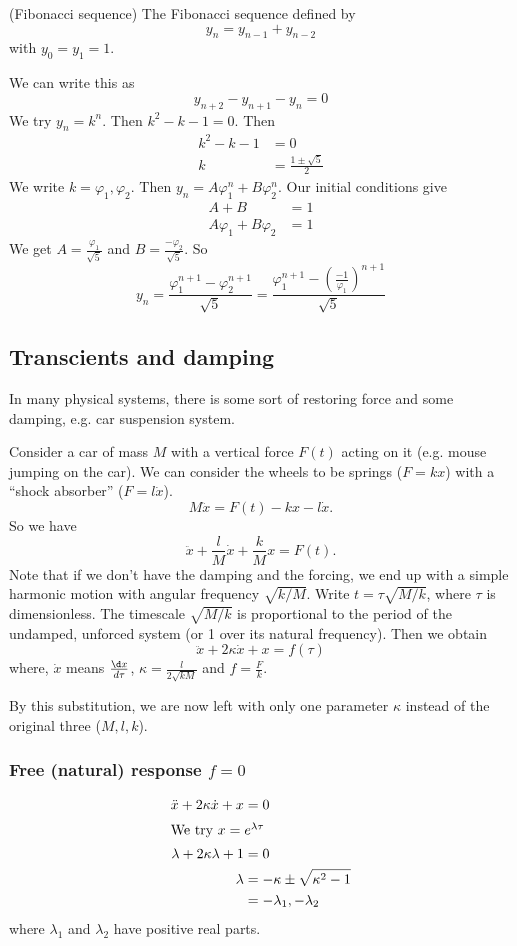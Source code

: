 \documentclass[a4paper]{article}
\begin{document}
\begin{eg}
  (Fibonacci sequence) The Fibonacci sequence defined by
  \[
  y_n = y_{n - 1} + y_{n - 2}
  \]
  with $y_0 = y_1 = 1$.

  We can write this as
  \[
  y_{n + 2} - y_{n + 1} - y_n = 0
  \]
  We try $y_n = k^n$. Then $k^2 - k - 1 = 0$. Then
  \begin{align*}
    k^2 - k - 1 &= 0\\
    k &= \frac{1 \pm \sqrt{5}}{2}
  \end{align*}
  We write $k = \varphi_1, \varphi_2$. Then $y_n = A\varphi_1^n + B\varphi_2^n$. Our initial conditions give
  \begin{align*}
    A + B &= 1\\
    A\varphi_1 + B\varphi_2 &= 1
  \end{align*}
  We get $\displaystyle A = \frac{\varphi_1}{\sqrt{5}}$ and $\displaystyle B = \frac{-\varphi_2}{\sqrt{5}}$. So
  \[
  y_n = \frac{\varphi_1^{n + 1} - \varphi_2^{n + 1}}{\sqrt{5}} = \frac{\varphi_1^{n + 1} - \left(\frac{-1}{\varphi_1}\right)^{n + 1}}{\sqrt{5}}
  \]
\end{eg}

\subsection{Transcients and damping}
In many physical systems, there is some sort of restoring force and some damping, e.g. car suspension system.

Consider a car of mass $M$ with a vertical force $F(t)$ acting on it (e.g. mouse jumping on the car). We can consider the wheels to be springs ($F = kx$) with a ``shock absorber'' ($F = l\dot x$).
\[
M\ddot x = F(t) - kx - l\dot x.
\]
So we have
\[
\ddot x + \frac{l}{M}\dot x + \frac{k}{M}x = F(t).
\]
Note that if we don't have the damping and the forcing, we end up with a simple harmonic motion with angular frequency $\sqrt{k/M}$. Write $t = \tau \sqrt{M/k}$, where $\tau$ is dimensionless. The timescale $\sqrt{M/k}$ is proportional to the period of the undamped, unforced system (or 1 over its natural frequency). Then we obtain
\[
\ddot x + 2\kappa\dot x + x = f(\tau)
\]
where, $\dot x$ means $\frac{\d x}{d\tau}$, $\kappa = \frac{l}{2\sqrt{kM}}$ and $f = \frac{F}{k}$.

By this substitution, we are now left with only one parameter $\kappa$ instead of the original three ($M, l, k$).

\subsubsection{Free (natural) response \texorpdfstring{$f = 0$}{f = 0}}
\begin{align*}
  \ddot x + 2\kappa \dot x + x &= 0\\
\intertext{We try $x = e^{\lambda \tau}$}
  \lambda + 2\kappa\lambda + 1 &= 0\\
  \lambda &= -\kappa \pm \sqrt{\kappa^2 - 1}\\
  &= -\lambda_1, -\lambda_2
\end{align*}
where $\lambda_1$ and $\lambda_2$ have positive real parts.
\end{document}
